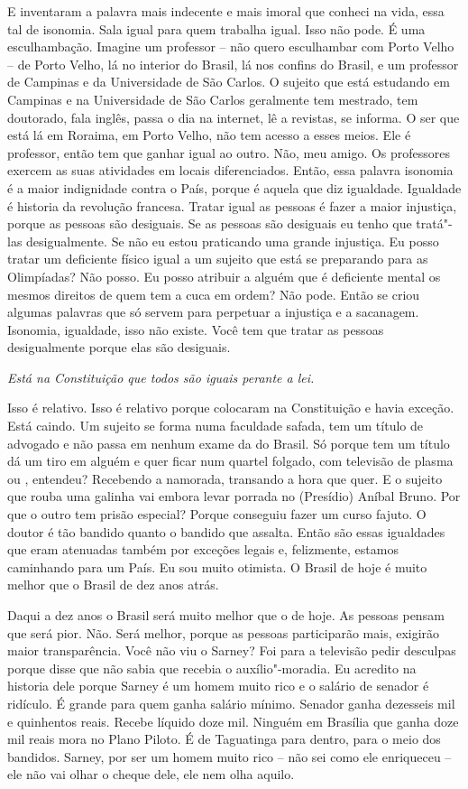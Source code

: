 E inventaram a palavra mais indecente e mais imoral que conheci na vida,
essa tal de isonomia. Sala igual para quem trabalha igual. Isso não
pode. É uma esculhambação. Imagine um professor -- não quero esculhambar
com Porto Velho -- de Porto Velho, lá no interior do Brasil, lá nos
confins do Brasil, e um professor de Campinas e da Universidade de São
Carlos. O sujeito que está estudando em Campinas e na Universidade de
São Carlos geralmente tem mestrado, tem doutorado, fala inglês, passa o
dia na internet, lê a revistas, se informa. O ser que está lá em
Roraima, em Porto Velho, não tem acesso a esses meios. Ele é professor,
então tem que ganhar igual ao outro. Não, meu amigo. Os professores
exercem as suas atividades em locais diferenciados. Então, essa palavra
isonomia é a maior indignidade contra o País, porque é aquela que diz
igualdade. Igualdade é historia da revolução francesa. Tratar igual as
pessoas é fazer a maior injustiça, porque as pessoas são desiguais. Se
as pessoas são desiguais eu tenho que tratá"-las desigualmente. Se não eu
estou praticando uma grande injustiça. Eu posso tratar um deficiente
físico igual a um sujeito que está se preparando para as Olimpíadas? Não
posso. Eu posso atribuir a alguém que é deficiente mental os mesmos
direitos de quem tem a cuca em ordem? Não pode. Então se criou algumas
palavras que só servem para perpetuar a injustiça e a sacanagem.
Isonomia, igualdade, isso não existe. Você tem que tratar as pessoas
desigualmente porque elas são desiguais.

\medskip

\emph{Está na Constituição que todos são iguais perante a lei.}

Isso é relativo. Isso é relativo porque colocaram na
Constituição e havia exceção. Está caindo. Um sujeito se forma numa
faculdade safada, tem um título de advogado e não passa em nenhum exame
da  do Brasil. Só porque tem um título dá um tiro em alguém e quer
ficar num quartel folgado, com televisão de plasma ou , entendeu?
Recebendo a namorada, transando a hora que quer. E o sujeito que rouba
uma galinha vai embora levar porrada no (Presídio) Aníbal Bruno. Por que
o outro tem prisão especial? Porque conseguiu fazer um curso fajuto. O
doutor é tão bandido quanto o bandido que assalta. Então são essas
igualdades que eram atenuadas também por exceções legais e, felizmente,
estamos caminhando para um País. Eu sou muito otimista. O Brasil de hoje
é muito melhor que o Brasil de dez anos atrás.

Daqui a dez anos o Brasil será muito melhor que o de hoje. As pessoas
pensam que será pior. Não. Será melhor, porque as pessoas participarão
mais, exigirão maior transparência. Você não viu o Sarney? Foi para a
televisão pedir desculpas porque disse que não sabia que recebia o
auxílio"-moradia. Eu acredito na historia dele porque Sarney é um homem
muito rico e o salário de senador é ridículo. É grande para quem ganha
salário mínimo. Senador ganha dezesseis mil e quinhentos reais. Recebe
líquido doze mil. Ninguém em Brasília que ganha doze mil reais mora no
Plano Piloto. É de Taguatinga para dentro, para o meio dos bandidos.
Sarney, por ser um homem muito rico -- não sei como ele enriqueceu --
ele não vai olhar o cheque dele, ele nem olha aquilo.

